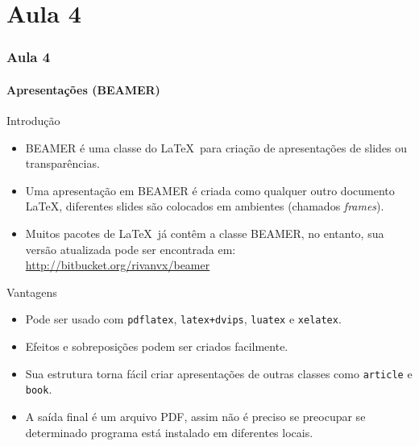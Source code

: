 
\part{Aula 4}
\section{Aula 4}

\subsection{Apresentações (BEAMER)}

\begin{frame}[fragile]{Introdução}
    \begin{itemize}
    \item {\footnotesize BEAMER} é uma classe do \LaTeX\ para criação de apresentações de slides ou transparências.
    \item Uma apresentação em {\footnotesize BEAMER} é criada como qualquer outro documento \LaTeX, diferentes slides são colocados em ambientes (chamados \textit{frames}).
    \item Muitos pacotes de \LaTeX\ já contêm a classe {\footnotesize BEAMER}, no entanto, sua versão atualizada pode ser encontrada em: \url{http://bitbucket.org/rivanvx/beamer}
    \end{itemize}
\end{frame}

\begin{frame}[fragile]{Vantagens}
    \begin{itemize}
    \item Pode ser usado com \verb|pdflatex|, \verb|latex+dvips|, \verb|luatex| e \verb|xelatex|.
    \item Efeitos e sobreposições podem ser criados facilmente.
    \item Sua estrutura torna fácil criar apresentações de outras classes como \verb|article| e \verb|book|.
    \item A saída final é um arquivo PDF, assim não é preciso se preocupar se determinado programa está instalado em diferentes locais.
    \end{itemize}
\end{frame}

